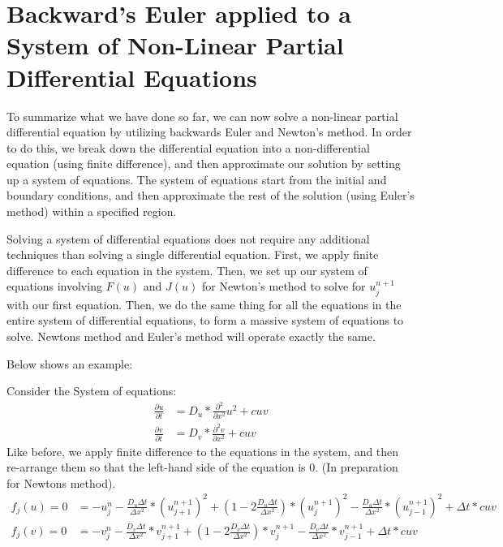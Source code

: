 \documentclass[11pt]{article}
\begin{document}
\newpage
\section*{Backward's Euler applied to a System of Non-Linear Partial Differential Equations}

To summarize what we have done so far, we can now solve a non-linear partial differential equation by utilizing backwards Euler and Newton's method. In order to do this, we break down the differential equation into a non-differential equation (using finite difference), and then approximate our solution by setting up a system of equations. The system of equations start from the initial and boundary conditions, and then approximate the rest of the solution (using Euler's method) within a specified region.

Solving a system of differential equations does not require any additional techniques than solving a single differential equation. First, we apply finite difference to each equation in the system. Then, we set up our system of equations involving $F(u)$ and $J(u)$ for Newton's method to solve for $u^{n+1}_j$ with our first equation. Then, we do the same thing for all the equations in the entire system of differential equations, to form a massive system of equations to solve. Newtons method and Euler's method will operate exactly the same.

Below shows an example:

Consider the System of equations:
\begin{align*}
    \frac{\partial u}{\partial t} &= D_u * \frac{\partial^{2}}{\partial x^{2}}u^2 + cuv\\
    \frac{\partial v}{\partial t} &= D_v * \frac{\partial^{2}v}{\partial x^{2}} + cuv
\end{align*}
Like before, we apply finite difference to the equations in the system, and then re-arrange them so that the left-hand side of the equation is 0. (In preparation for Newtons method).
\begin{align*}
    f_j(u) = 0 &= -u^{n}_{j}-\frac{D_u\Delta t}{\Delta x^2}*(u^{n+1}_{j+1})^2 + (1-2\frac{D_u\Delta t}{\Delta x^2})*(u^{n+1}_{j})^2 - \frac{D_u\Delta t}{\Delta x^2}*(u^{n+1}_{j-1})^2 + \Delta t*cuv\\
    f_j(v) = 0 &= -v^{n}_{j}-\frac{D_v\Delta t}{\Delta x^2}*v^{n+1}_{j+1} + (1-2\frac{D_v\Delta t}{\Delta x^2})*v^{n+1}_{j} - \frac{D_v\Delta t}{\Delta x^2}*v^{n+1}_{j-1} + \Delta t*cuv
\end{align*}
\end{document}
